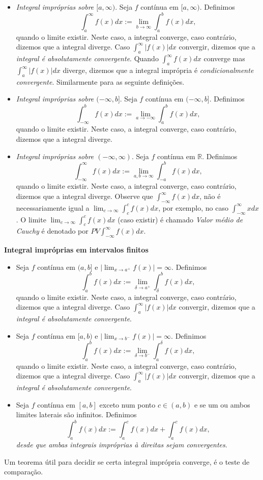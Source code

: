 \documentclass{article}
\theoremstyle{plain}
\theoremstyle{definition}
\theoremstyle{remark}
\begin{document}
 \begin{itemize}
 	\item {\it Integral impróprias sobre $[a, \infty)$}.
 	Seja $f$ contínua em $[a,\infty)$. Definimos
 	$$\int_{a}^{\infty} f(x)dx:=\lim_{b \rightarrow \infty} \int_{a}^{b} f(x)dx, $$
 	quando o limite existir. Neste caso, a integral converge, caso contrário, dizemos que a integral diverge.
 	Caso $\int_{a}^{\infty} |f(x)|dx$ convergir, dizemos que a {\it integral é absolutamente convergente}.
 	Quando $\int_{a}^{\infty} f(x)dx$ converge mas 
 	$\int_{a}^{\infty} |f(x)|dx$ diverge, dizemos que 
 	a integral imprópria é {\it condicionalmente convergente}. Similarmente para as seguinte definições.
 	\item  {\it Integral impróprias sobre $(-\infty, b]$}.
 	Seja $f$ contínua em $(-\infty,b]$. Definimos
 	$$\int_{-\infty}^{b} f(x)dx:=\lim_{a \rightarrow -\infty} \int_{a}^{b} f(x)dx, $$
 	quando o limite existir. Neste caso, a integral converge, caso contrário, dizemos que a integral diverge.
 	\item  {\it Integral impróprias sobre $(-\infty, \infty)$}.
 	Seja $f$ contínua em $\mathbb{R}$. Definimos
 	$$\int_{-\infty}^{\infty} f(x)dx:=\lim_{a, b \rightarrow \infty} \int_{-a}^{b} f(x)dx, $$
 	quando o limite existir. Neste caso, a integral converge, caso contrário, dizemos que a integral diverge.
 	Observe que $\int_{-\infty}^{\infty} f(x)dx$, não é necessariamente igual a 
 	$\lim_{c \rightarrow \infty} \int_{c}^{c} f(x)dx$, por exemplo, no caso $\int_{-\infty}^{\infty} xdx$.
 O limite $\lim_{c \rightarrow \infty} \int_{c}^{c} f(x)dx$ (caso existir) é chamado 
 {\it Valor médio de Cauchy} é denotado por 
 $PV \int_{-\infty}^{\infty} f(x)dx$.
 \end{itemize}
 {\bf Integral impróprias em intervalos finitos}
  \begin{itemize}
  	\item Seja $f$ contínua em $(a,b]$ e $|\lim_{x \rightarrow a^{+}}f(x)|=\infty$.
  	Definimos
  	$$\int_{a}^{b} f(x)dx:=\lim_{\delta \rightarrow a^{+}} \int_{\delta}^{b} f(x)dx, $$
  	quando o limite existir. Neste caso, a integral converge, caso contrário, dizemos que a integral diverge.
  	Caso $\int_{a}^{\infty} |f(x)|dx$ convergir, dizemos que a {\it integral é absolutamente convergente}.
  	\item Seja $f$ contínua em $[a,b)$ e $|\lim_{x \rightarrow b^{-}}f(x)|=\infty$.
  	Definimos
  	$$\int_{a}^{b} f(x)dx:=\lim_{\delta \rightarrow b^{-}} \int_{a}^{\delta} f(x)dx, $$
  	quando o limite existir. Neste caso, a integral converge, caso contrário, dizemos que a integral diverge.
  	Caso $\int_{a}^{\infty} |f(x)|dx$ convergir, dizemos que a {\it integral é absolutamente convergente}.
    \item  Seja $f$ contínua em $[a,b]$ exceto num ponto $c\in(a,b)$ e se um ou ambos limites 
    laterais são infinitos. Definimos
    $$\int_{a}^{b} f(x)dx:=\int_{a}^{c} f(x)dx+ \int_{a}^{c} f(x)dx, $$
    {\it desde que ambas integrais impróprias à direitas sejam convergentes}.
 \end{itemize}
Um teorema útil para decidir se certa integral imprópria converge, é o teste de comparação. \newline
\end{document}
